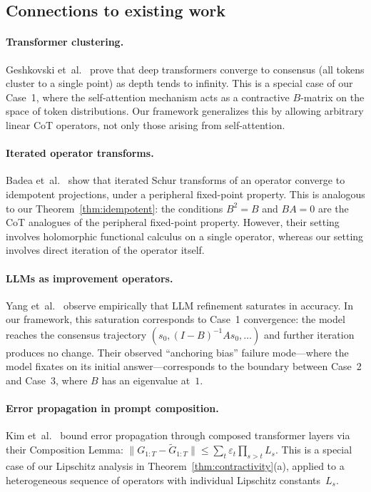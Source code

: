 \subsection{Connections to existing work}

\paragraph{Transformer clustering.}
Geshkovski et~al.~\cite{Geshkovski2023} prove that deep transformers
converge to consensus (all tokens cluster to a single point) as depth tends
to infinity. This is a special case of our Case~1, where the self-attention
mechanism acts as a contractive $B$-matrix on the space of token
distributions. Our framework generalizes this by allowing arbitrary linear
CoT operators, not only those arising from self-attention.

\paragraph{Iterated operator transforms.}
Badea et~al.~\cite{Badea2025} show that iterated Schur transforms of an
operator converge to idempotent projections, under a peripheral fixed-point
property. This is analogous to our Theorem~\ref{thm:idempotent}: the
conditions $B^2=B$ and $BA=0$ are the CoT analogues of the peripheral
fixed-point property. However, their setting involves holomorphic functional
calculus on a single operator, whereas our setting involves direct iteration
of the operator itself.

\paragraph{LLMs as improvement operators.}
Yang et~al.~\cite{Yang2025} observe empirically that LLM refinement saturates
in accuracy. In our framework, this saturation corresponds to Case~1
convergence: the model reaches the consensus trajectory
$(s_0,(I-B)^{-1}As_0,\dots)$ and further iteration produces no change. Their
observed ``anchoring bias'' failure mode---where the model fixates on its
initial answer---corresponds to the boundary between Case~2 and Case~3, where
$B$ has an eigenvalue at~$1$.

\paragraph{Error propagation in prompt composition.}
Kim et~al.~\cite{Kim2025} bound error propagation through composed
transformer layers via their Composition Lemma:
$\|G_{1:T}-\tilde{G}_{1:T}\|\leq\sum_t\varepsilon_t\prod_{s>t}L_s$.
This is a special case of our Lipschitz analysis in
Theorem~\ref{thm:contractivity}(a), applied to a heterogeneous sequence of
operators with individual Lipschitz constants~$L_s$.

